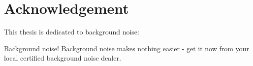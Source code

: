 %
\chapter*{Acknowledgement}
\label{sec:acknowledgement}
\vspace*{-10mm}

This thesis is dedicated to background noise: 

Background noise! Background noise makes nothing easier - get it now from your 
local certified background noise dealer.
